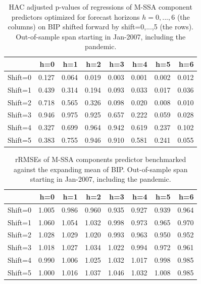 \documentclass[a4paper]{article}
\begin{document}
\begin{table}[ht]
\centering
\begin{tabular}{rrrrrrrr}
  \hline
 & h=0 & h=1 & h=2 & h=3 & h=4 & h=5 & h=6 \\ 
  \hline
Shift=0 & 0.127 & 0.064 & 0.019 & 0.003 & 0.001 & 0.002 & 0.012 \\ 
  Shift=1 & 0.439 & 0.314 & 0.194 & 0.093 & 0.033 & 0.017 & 0.036 \\ 
  Shift=2 & 0.718 & 0.565 & 0.326 & 0.098 & 0.020 & 0.008 & 0.010 \\ 
  Shift=3 & 0.946 & 0.975 & 0.925 & 0.657 & 0.222 & 0.059 & 0.028 \\ 
  Shift=4 & 0.327 & 0.699 & 0.964 & 0.942 & 0.619 & 0.237 & 0.102 \\ 
  Shift=5 & 0.383 & 0.755 & 0.946 & 0.910 & 0.581 & 0.241 & 0.055 \\ 
   \hline
\end{tabular}
\caption{HAC adjusted p-values of regressions of M-SSA component predictors optimized for forecast horizons $h=0,...,6$  (the columns) on BIP shifted forward by shift=0,...,5 (the rows). Out-of-sample span starting in Jan-2007, including the pandemic.} 
\label{p_val1}
\end{table}%
\begin{table}[ht]
\centering
\begin{tabular}{rrrrrrrr}
  \hline
 & h=0 & h=1 & h=2 & h=3 & h=4 & h=5 & h=6 \\ 
  \hline
Shift=0 & 1.005 & 0.986 & 0.960 & 0.935 & 0.927 & 0.939 & 0.964 \\ 
  Shift=1 & 1.060 & 1.054 & 1.032 & 0.998 & 0.973 & 0.965 & 0.970 \\ 
  Shift=2 & 1.028 & 1.029 & 1.020 & 0.993 & 0.963 & 0.950 & 0.952 \\ 
  Shift=3 & 1.018 & 1.027 & 1.034 & 1.022 & 0.994 & 0.972 & 0.961 \\ 
  Shift=4 & 0.990 & 1.006 & 1.025 & 1.032 & 1.017 & 0.998 & 0.985 \\ 
  Shift=5 & 1.000 & 1.016 & 1.037 & 1.046 & 1.032 & 1.008 & 0.985 \\ 
   \hline
\end{tabular}
\caption{rRMSEs of M-SSA components predictor benchmarked against the expanding mean of BIP. Out-of-sample span starting in Jan-2007, including the pandemic.} 
\label{rRMSE_mSSA_comp_mean2}
\end{table}%
\end{document}
